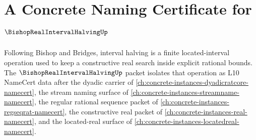 \chapter{A Concrete Naming Certificate for $\BishopRealIntervalHalvingUp$}
\label{ch:concrete-instances-bishop-real-interval-halving-namecert}

Following Bishop and Bridges, interval halving is a finite located-interval operation used to keep a constructive real search inside explicit rational bounds. The $\BishopRealIntervalHalvingUp$ packet isolates that operation as L10 NameCert data after the dyadic carrier of \autoref{ch:concrete-instances-dyadicratcore-namecert}, the stream naming surface of \autoref{ch:concrete-instances-streamname-namecert}, the regular rational sequence packet of \autoref{ch:concrete-instances-regseqrat-namecert}, the constructive real packet of \autoref{ch:concrete-instances-real-namecert}, and the located-real surface of \autoref{ch:concrete-instances-locatedreal-namecert}.

